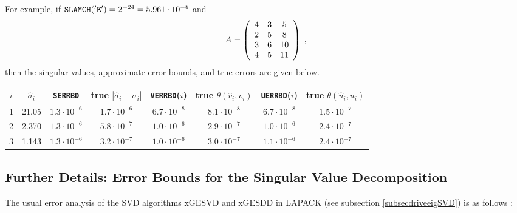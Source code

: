 For example, if
${\tt SLAMCH('E')} = 2^{-24} = 5.961 \cdot 10^{-8}$
and
\[
A = \bmat{ccc} 4 & 3 & 5 \\ 2 & 5 & 8 \\ 3 & 6 & 10 \\ 4 & 5 & 11 \emat \; ,
\]
then the singular values, approximate error bounds, and true errors are given below.

\begin{center}
\begin{tabular}{||c|c||c|c||c|c||c|c||}
\hline
$i$ & $\hat{\sigma}_i$ & {\tt SERRBD} & true $| \hat{\sigma}_i - \sigma_i |$ &
{\tt VERRBD}($i$) & true $\theta ( \hat{v}_i , v_i )$ &
{\tt UERRBD}($i$) & true $\theta ( \hat{u}_i , u_i )$  \\ \hline
1 & 21.05 & $1.3 \cdot 10^{-6}$ & $1.7 \cdot 10^{-6}$ &
$6.7 \cdot 10^{-8}$ & $8.1 \cdot 10^{-8}$ &
$6.7 \cdot 10^{-8}$ & $1.5 \cdot 10^{-7}$ \\
2 & 2.370 & $1.3 \cdot 10^{-6}$ & $5.8 \cdot 10^{-7}$ &
$1.0 \cdot 10^{-6}$ & $2.9 \cdot 10^{-7}$ &
$1.0 \cdot 10^{-6}$ & $2.4 \cdot 10^{-7}$  \\
3 & 1.143 & $1.3 \cdot 10^{-6}$ & $3.2 \cdot 10^{-7}$ &
$1.0 \cdot 10^{-6}$ & $3.0 \cdot 10^{-7}$ &
$1.1 \cdot 10^{-6}$ & $2.4 \cdot 10^{-7}$ \\ \hline
\end{tabular}
\end{center}

\subsection{Further Details:  Error Bounds for the Singular Value Decomposition}\label{secbackgroundsvd}

The usual error analysis of the SVD
algorithms
xGESVD and xGESDD in LAPACK (see subsection \ref{subsecdriveeigSVD})
is as follows \cite{demmelMA221,GVL2}:

